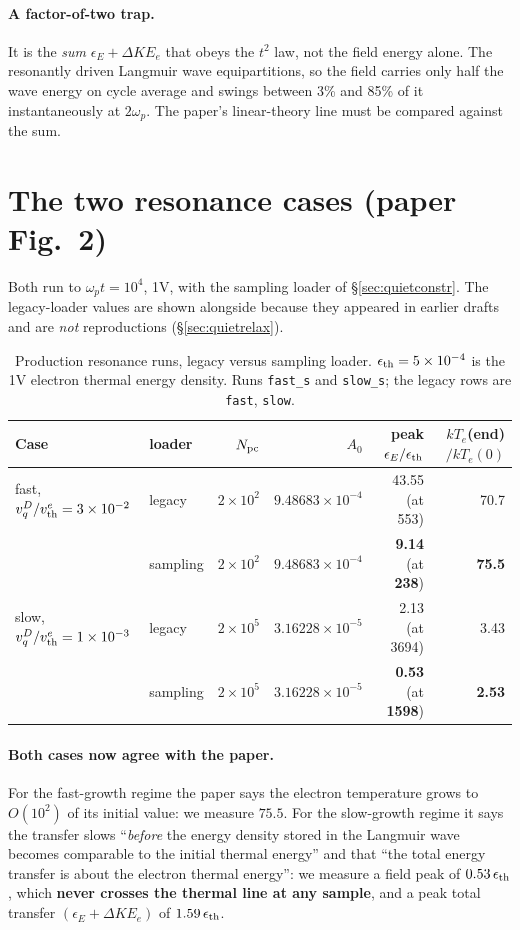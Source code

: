 \documentclass[11pt,a4paper]{article}
\newcommand{\code}[1]{\texttt{\small #1}}
\newcommand{\wpt}{\omega_p t}
\newcommand{\vth}{v_{\rm th}^{e}}
\newcommand{\Npc}{N_{\rm pc}}
\begin{document}
\paragraph{A factor-of-two trap.} It is the \emph{sum} $\epsilon_E + \Delta KE_e$ that
obeys the $t^2$ law, not the field energy alone. The resonantly driven Langmuir wave
equipartitions, so the field carries only half the wave energy on cycle average and
swings between 3\% and 85\% of it instantaneously at $2\omega_p$. The paper's
linear-theory line must be compared against the sum.

\section{The two resonance cases (paper Fig.~2)}
\label{sec:resonance}

Both run to $\wpt = 10^4$, 1V, with the sampling loader of \S\ref{sec:quietconstr}.
The legacy-loader values are shown alongside because they appeared in earlier drafts
and are \emph{not} reproductions (\S\ref{sec:quietrelax}).

\begin{table}[h]
\centering\small
\begin{tabular}{@{}llrrrr@{}}
\toprule
Case & loader & $\Npc$ & $A_0$ & peak $\epsilon_E/\epsilon_{\rm th}$ & $kT_e$(end)$/kT_e(0)$ \\
\midrule
fast, $v_q^D/\vth = 3\times10^{-2}$ & legacy   & $2\times10^2$ & $9.48683\times10^{-4}$ & 43.55 (at 553)  & 70.7 \\
                                    & sampling & $2\times10^2$ & $9.48683\times10^{-4}$ & \textbf{9.14} (at \textbf{238}) & \textbf{75.5} \\
slow, $v_q^D/\vth = 1\times10^{-3}$ & legacy   & $2\times10^5$ & $3.16228\times10^{-5}$ & 2.13 (at 3694) & 3.43 \\
                                    & sampling & $2\times10^5$ & $3.16228\times10^{-5}$ & \textbf{0.53} (at \textbf{1598}) & \textbf{2.53} \\
\bottomrule
\end{tabular}
\caption{Production resonance runs, legacy versus sampling loader.
$\epsilon_{\rm th} = 5\times10^{-4}$ is the 1V electron thermal energy density.
Runs \code{fast\_s} and \code{slow\_s}; the legacy rows are \code{fast}, \code{slow}.}
\end{table}

\paragraph{Both cases now agree with the paper.} For the fast-growth regime the paper
says the electron temperature grows to $O(10^2)$ of its initial value: we measure
$75.5$. For the slow-growth regime it says the transfer slows ``\emph{before} the
energy density stored in the Langmuir wave becomes comparable to the initial thermal
energy'' and that ``the total energy transfer is about the electron thermal energy'':
we measure a field peak of $0.53\,\epsilon_{\rm th}$, which \textbf{never crosses the
thermal line at any sample}, and a peak total transfer
$(\epsilon_E + \Delta KE_e)$ of $1.59\,\epsilon_{\rm th}$.
\end{document}
